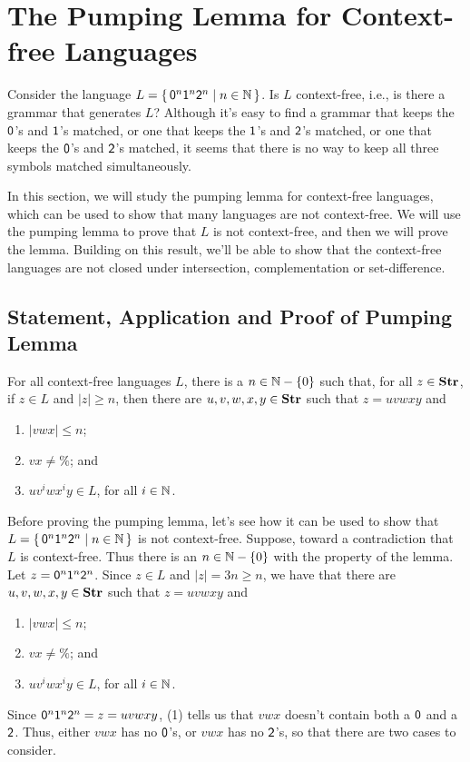 \section{The Pumping Lemma for Context-free Languages}
\label{ThePumpingLemmaForContextFreeLanguages}

Consider the language $L =
\{ \, \mathsf{0}^n\mathsf{1}^n\mathsf{2}^n \mid n\in\mathbb{N} \, \}$.  Is $L$ context-free,
i.e., is there a grammar that generates $L$?  Although it's easy to
find a grammar that keeps the $\mathsf{0}$'s and $\mathsf{1}$'s matched, or
one that keeps the $\mathsf{1}$'s and $\mathsf{2}$'s matched, or one that
keeps the $\mathsf{0}$'s and $\mathsf{2}$'s matched, it seems that there is
no way to keep all three symbols matched simultaneously.

In this section, we will study the pumping lemma for context-free
languages, which can be used to show that many languages are not
context-free.  We will use the pumping lemma to prove that $L$ is not
context-free, and then we will prove the lemma.  Building on this
result, we'll be able to show that the context-free languages are not
closed under intersection, complementation or set-difference.

\subsection{Statement, Application and Proof of Pumping Lemma}

\begin{lemma}
For all context-free languages $L$, there is a
$n\in\mathbb{N}-\{0\}$ such that, for all $z\in\mathbf{Str}$, if $z\in L$
and $|z|\geq n$, then there are $u,v,w,x,y\in\mathbf{Str}$ such
that $z=uvwxy$ and
\begin{enumerate}[\quad(1)]
\item $|vwx|\leq n$;

\item $vx\neq\%$; and

\item $uv^iwx^iy\in L$, for all $i\in\mathbb{N}$.
\end{enumerate}
\end{lemma}

Before proving the pumping lemma, let's see how it can be used to show
that $L=\{ \, \mathsf{0}^n\mathsf{1}^n\mathsf{2}^n \mid n\in\mathbb{N} \, \}$ is not
context-free.  Suppose, toward a contradiction that $L$ is
context-free.  Thus there is an $n\in\mathbb{N}-\{0\}$ with the property of the
lemma.  Let $z={\mathsf{0}^n\mathsf{1}^n\mathsf{2}^n}$.
Since $z\in L$ and $|z|=3n\geq n$, we have that there are
$u,v,w,x,y\in\mathbf{Str}$ such that $z=uvwxy$ and
\begin{enumerate}[\quad(1)]
\item $|vwx|\leq n$;

\item $vx\neq\%$; and

\item $uv^iwx^iy\in L$, for all $i\in\mathbb{N}$.
\end{enumerate}
Since $\mathsf{0}^n\mathsf{1}^n\mathsf{2}^n=z=uvwxy$, (1) tells us that
$vwx$ doesn't contain both a $\mathsf{0}$ and a $\mathsf{2}$.
Thus, either $vwx$ has no $\mathsf{0}$'s, or $vwx$ has no $\mathsf{2}$'s, so that
there are two cases to consider.

